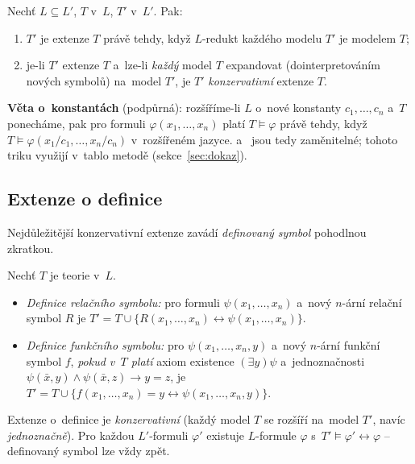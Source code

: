 \documentclass[11pt,a4paper]{article}
\begin{document}
\begin{veta}
Nechť $L\subseteq L'$, $T$ v~$L$, $T'$ v~$L'$. Pak:
\begin{enumerate}[label=\emph{(\roman*)}]
  \item $T'$ je extenze $T$ právě tehdy, když $L$-redukt každého modelu $T'$ je modelem $T$;
  \item je-li $T'$ extenze $T$ a~lze-li \emph{každý} model $T$ expandovat (dointerpretováním nových symbolů) na~model $T'$, je $T'$ \emph{konzervativní} extenze $T$.
\end{enumerate}
\end{veta}

\begin{poznamka}
\textbf{Věta o~konstantách} (podpůrná): rozšíříme-li $L$ o~nové konstanty $c_1,\dots,c_n$ a~$T$ ponecháme, pak pro formuli $\varphi(x_1,\dots,x_n)$ platí $T\models\varphi$ právě tehdy, když $T\models\varphi(x_1/c_1,\dots,x_n/c_n)$ v~rozšířeném jazyce.  a~ jsou tedy zaměnitelné; tohoto triku využijí  v~tablo metodě (sekce~\ref{sec:dokaz}).
\end{poznamka}

\subsection{Extenze o definice}

Nejdůležitější konzervativní extenze zavádí \emph{definovaný symbol} pohodlnou zkratkou.

\begin{definice}
Nechť $T$ je teorie v~$L$.
\begin{itemize}
  \item \emph{Definice relačního symbolu:} pro formuli $\psi(x_1,\dots,x_n)$ a~nový $n$-ární relační symbol $R$ je $T'=T\cup\{R(x_1,\dots,x_n)\leftrightarrow\psi(x_1,\dots,x_n)\}$.
  \item \emph{Definice funkčního symbolu:} pro $\psi(x_1,\dots,x_n,y)$ a~nový $n$-ární funkční symbol $f$, \emph{pokud v~$T$ platí} axiom existence $(\exists y)\psi$ a~jednoznačnosti $\psi(\bar x,y)\wedge\psi(\bar x,z)\to y=z$, je $T'=T\cup\{f(x_1,\dots,x_n)=y\leftrightarrow\psi(x_1,\dots,x_n,y)\}$.
\end{itemize}
\end{definice}

\begin{dusledek}[Konzervativnost]
Extenze o~definice je \emph{konzervativní} (každý model $T$ se rozšíří na~model $T'$, navíc \emph{jednoznačně}). Pro každou $L'$-formuli $\varphi'$ existuje $L$-formule $\varphi$ s~$T'\models\varphi'\leftrightarrow\varphi$ -- definovaný symbol lze vždy  zpět.
\end{dusledek}
\end{document}
